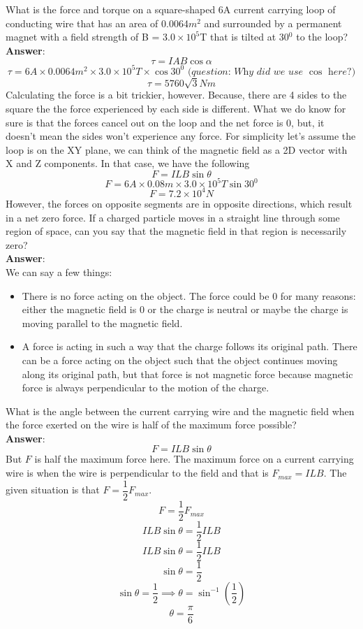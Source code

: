 \documentclass[9pt,addpoints]{exam}
\begin{document}
	\begin{questions}
		\question What is the force and torque on a square-shaped 6A current carrying loop of conducting wire that has an area of 0.0064$m^2$ and surrounded by a permanent magnet with a field strength of B = $3.0\times10^5$T that is tilted at 30$^0$ to the loop? \\ \textbf{Answer}: \\
		$$\tau=IAB\cos\alpha$$
		$$\tau=6A\times0.0064m^2\times3.0\times10^{5}T\times\cos30^0\textit{ (question: Why did we use }\cos\textit{ here?)}$$
		$$\tau=5760\sqrt{3}Nm$$
		Calculating the force is a bit trickier, however. Because, there are 4 sides to the square the the force experienced by each side is different. What we do know for sure is that the forces cancel out on the loop and the net force is 0, but, it doesn't mean the sides won't experience any force. For simplicity let's assume the loop is on the XY plane, we can think of the magnetic field as a 2D vector with X and Z components. In that case, we have the following 
		$$F=ILB\sin\theta$$
		$$F=6A\times0.08m\times3.0\times10^5T\sin30^0$$
		$$F=7.2\times10^{4}N$$
		However, the forces on opposite segments are in opposite directions, which result in a net zero force.
		\question If a charged particle moves in a straight line through some region of space, can you say that the magnetic field in that region is necessarily zero?\\ \textbf{Answer}: \\
		We can say a few things: \begin{itemize}
			\item There is no force acting on the object. The force could be 0 for many reasons: either the magnetic field is 0 or the charge is neutral or maybe the charge is moving parallel to the magnetic field. 
			\item A force is acting in such a way that the charge follows its original path. There can be a force acting on the object such that the object continues moving along its original path, but that force is not magnetic force because magnetic force is always perpendicular to the motion of the charge.
		\end{itemize}
		\question What is the angle between the current carrying wire and the magnetic field when the force exerted on the wire is half of the maximum force possible? \\ \textbf{Answer}: \\
		$$F=ILB\sin\theta$$
		But $F$ is half the maximum force here. The maximum force on a current carrying wire is when the wire is perpendicular to the field and that is $F_{max}=ILB$. The given situation is that $F=\dfrac{1}{2}F_{max}$.
		$$F=\dfrac{1}{2}F_{max}$$
		$$ILB\sin\theta=\dfrac{1}{2}ILB$$
		$$ILB\sin\theta=\dfrac{1}{2}ILB$$
		$$\sin\theta=\dfrac{1}{2}$$
		$$\sin\theta=\dfrac{1}{2}\implies \theta=\sin^{-1}\left(\dfrac{1}{2}\right)$$
		$$\theta=\dfrac{\pi}{6}$$

\end{questions}
\end{document}
